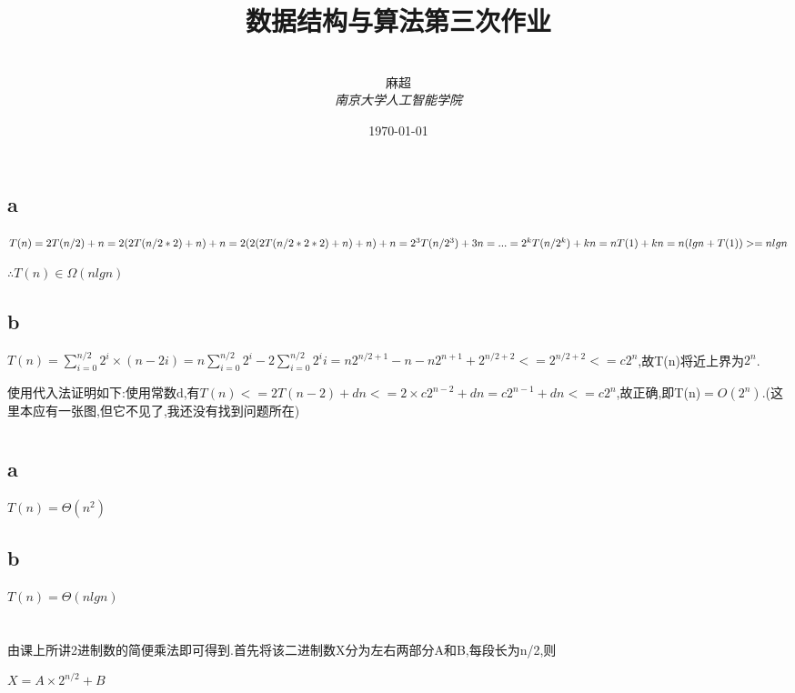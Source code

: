 \documentclass[12pt,a4paper]{ctexart}
\title{\textbf{数据结构与算法第三次作业}}
\author{
\\
\Large{麻超 \quad 201300066}
\\[6pt]
{ \large \textit{南京大学人工智能学院}}\\[2pt]
}
\date{\today}
\begin{document}
\maketitle
\setcounter{page}{1}
\section{}
\subsection{a}
$T(n)=2T(n/2)+n\\
    =2(2T(n/2*2)+n)+n\\
    =2(2(2T(n/2*2*2)+n)+n)+n\\
    =2^3T(n/2^3)+3n\\
    =...\\
    =2^kT(n/2^k)+kn\\
    =nT(1)+kn\\
    =n(lgn+T(1))>=nlgn$

$\therefore T(n)\in \Omega(nlgn)$

\subsection{b}

$T(n)=\sum_{i=0}^{n/2}2^i\times (n-2i)=n\sum_{i=0}^{n/2}2^i-2\sum_{i=0}^{n/2}2^ii=n2^{n/2+1}-n-n2^{n+1}+2^{n/2+2}<=2^{n/2+2}<=c2^n$,故T(n)将近上界为$2^n$.

使用代入法证明如下:使用常数d,有$T(n)<=2T(n-2)+dn<=2\times c2^{n-2}+dn=c2^{n-1}+dn<=c2^n$,故正确,即T(n)$=O(2^n)$.(这里本应有一张图,但它不见了,我还没有找到问题所在)

\section{}
\subsection{a}
$T(n)=\Theta(n^2)$
\subsection{b}
$T(n)=\Theta(nlg n)$
\section{}
由课上所讲2进制数的简便乘法即可得到.首先将该二进制数X分为左右两部分A和B,每段长为n/2,则

$X=A\times 2^{n/2}+B$
\end{document}
